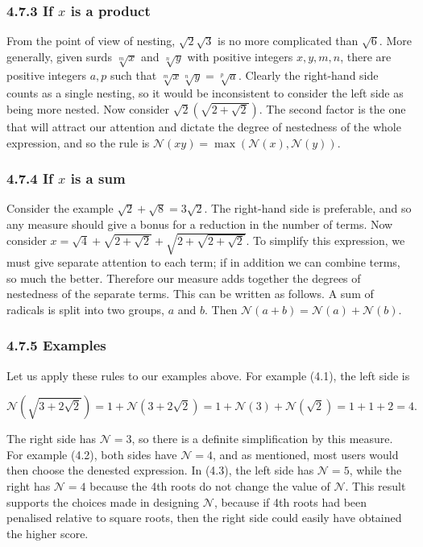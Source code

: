 \documentclass[11pt,letterpaper]{article}
\begin{document}
\subsubsection*{4.7.3 If $x$ is a product}

From the point of view of nesting, $\sqrt{2} \sqrt{3}$ is no more complicated than $\sqrt{6}$. More generally, given surds $\sqrt[m]{x}$ and $\sqrt[n]{y}$ with positive integers $x,y,m,n$, there are positive integers $a,p$ such that $\sqrt[m]{x} \sqrt[n]{y}=\sqrt[p]{a}$. Clearly the right-hand side counts as a single nesting, so it would be inconsistent to consider the left side as being more nested. Now consider $\sqrt{2}(\sqrt{2+\sqrt{2}})$. The second factor is the one that will attract our attention and dictate the degree of nestedness of the whole expression, and so the rule is $\mathcal{N}(x y)=\max (\mathcal{N}(x), \mathcal{N}(y))$.

\subsubsection*{4.7.4 If $x$ is a sum}

Consider the example $\sqrt{2}+\sqrt{8}=3 \sqrt{2}$. The right-hand side is preferable, and so any measure should give a bonus for a reduction in the number of terms. Now consider $x=\sqrt{4}+\sqrt{2+\sqrt{2}}+\sqrt{2+\sqrt{2+\sqrt{2}}}$. To simplify this expression, we must give separate attention to each term; if in addition we can combine terms, so much the better. Therefore our measure adds together the degrees of nestedness of the separate terms. This can be written as follows. A sum of radicals is split into two groups, $a$ and $b$. Then $\mathcal{N}(a+b)=\mathcal{N}(a)+\mathcal{N}(b)$.

\subsubsection*{4.7.5 Examples}

Let us apply these rules to our examples above. For example (4.1), the left side is

\[
\mathcal{N}(\sqrt{3+2 \sqrt{2}})=1+\mathcal{N}(3+2 \sqrt{2})=1+\mathcal{N}(3)+\mathcal{N}(\sqrt{2})=1+1+2=4 .
\]

The right side has $\mathcal{N}=3$, so there is a definite simplification by this measure. For example (4.2), both sides have $\mathcal{N}=4$, and as mentioned, most users would then choose the denested expression. In (4.3), the left side has $\mathcal{N}=5$, while the right has $\mathcal{N}=4$ because the 4th roots do not change the value of $\mathcal{N}$. This result supports the choices made in designing $\mathcal{N}$, because if 4th roots had been penalised relative to square roots, then the right side could easily have obtained the higher score.
\end{document}
